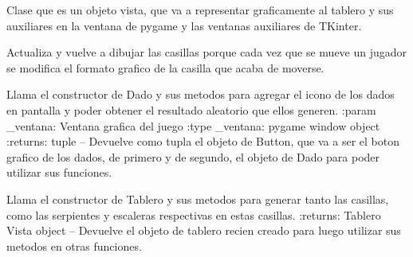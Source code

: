 \documentclass[letterpaper,10pt,english]{sphinxmanual}
\begin{document}
\begin{fulllineitems}
\label{\detokenize{codigo:vista.Vista}}
Clase que es un objeto vista, que va a representar graficamente al tablero y sus auxiliares
en la ventana de pygame y las ventanas auxiliares de TKinter.

\begin{fulllineitems}
\label{\detokenize{codigo:vista.Vista.actualizar_tablero_grafico}}
Actualiza y vuelve a dibujar las casillas porque cada vez que se mueve
un jugador se modifica el formato grafico de la casilla que acaba de moverse.

\end{fulllineitems}


\begin{fulllineitems}
\label{\detokenize{codigo:vista.Vista.crear_sidebar}}
Llama el constructor de Dado y sus metodos para agregar el icono de los 
dados en pantalla y poder obtener el resultado aleatorio que ellos generen.
:param \_ventana: Ventana grafica del juego
:type \_ventana: pygame window object
:returns: tuple -- Devuelve como tupla el objeto de Button, que va a ser el boton 
grafico de los dados, de primero y de segundo, el objeto de Dado para poder utilizar sus funciones.

\end{fulllineitems}


\begin{fulllineitems}
\label{\detokenize{codigo:vista.Vista.crear_tablero_grafico}}
Llama el constructor de Tablero y sus metodos para generar tanto las casillas, como
las serpientes y escaleras respectivas en estas casillas.
:returns: Tablero Vista object -- Devuelve el objeto de tablero recien creado para luego
utilizar sus metodos en otras funciones.


\end{fulllineitems}
\end{fulllineitems}
\end{document}
